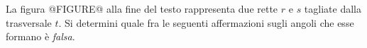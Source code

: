 La 
figura @FIGURE@ alla fine del testo
 rappresenta due rette $r$ e $s$ tagliate dalla 
trasversale $t$. Si determini quale fra le seguenti affermazioni 
sugli angoli che esse formano è \emph{falsa}.